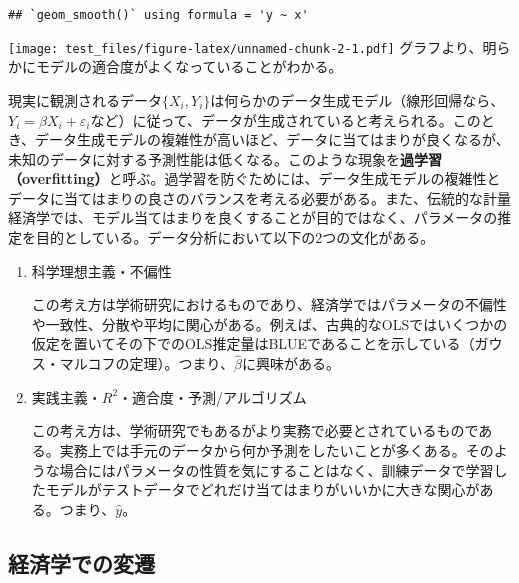 \documentclass[
  pandoc,
  jafont=haranoaji]{bxjsarticle}
\begin{document}
\begin{verbatim}
## `geom_smooth()` using formula = 'y ~ x'
\end{verbatim}

\texttt{[image: test\_files/figure-latex/unnamed-chunk-2-1.pdf]}
グラフより、明らかにモデルの適合度がよくなっていることがわかる。

現実に観測されるデータ\(\{X_i, Y_i\}\)は何らかのデータ生成モデル（線形回帰なら、\(Y_i = \beta X_i+\varepsilon_i\)など）に従って、データが生成されていると考えられる。このとき、データ生成モデルの複雑性が高いほど、データに当てはまりが良くなるが、未知のデータに対する予測性能は低くなる。このような現象を\textbf{過学習（overfitting）}と呼ぶ。過学習を防ぐためには、データ生成モデルの複雑性とデータに当てはまりの良さのバランスを考える必要がある。また、伝統的な計量経済学では、モデル当てはまりを良くすることが目的ではなく、パラメータの推定を目的としている。データ分析において以下の2つの文化がある。

\begin{enumerate}
\def\labelenumi{\arabic{enumi}.}
\item
  科学理想主義・不偏性

  この考え方は学術研究におけるものであり、経済学ではパラメータの不偏性や一致性、分散や平均に関心がある。例えば、古典的なOLSではいくつかの仮定を置いてその下でのOLS推定量はBLUEであることを示している（ガウス・マルコフの定理）。つまり、\(\hat{\beta}\)に興味がある。
\item
  実践主義・\(R^2\)・適合度・予測/アルゴリズム

  この考え方は、学術研究でもあるがより実務で必要とされているものである。実務上では手元のデータから何か予測をしたいことが多くある。そのような場合にはパラメータの性質を気にすることはなく、訓練データで学習したモデルがテストデータでどれだけ当てはまりがいいかに大きな関心がある。つまり、\(\hat{y}\)。
\end{enumerate}

\hypertarget{ux7d4cux6e08ux5b66ux3067ux306eux5909ux9077}{%
\subsection{経済学での変遷}\label{ux7d4cux6e08ux5b66ux3067ux306eux5909ux9077}}
\end{document}
